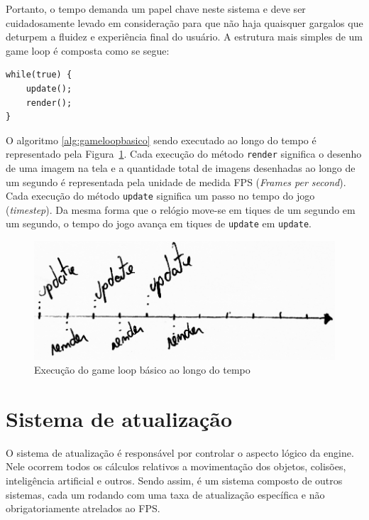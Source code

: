 \documentclass[12pt, 
openright, 
oneside, 
a4paper,    
brazil]{facom-ufu-abntex2}
\begin{document}
Portanto, o tempo demanda um papel chave neste sistema e deve ser cuidadosamente levado em consideração para que não haja quaisquer gargalos que deturpem a fluidez e experiência final do usuário. A estrutura mais simples de um game loop é composta como se segue:

\begin{lstlisting}[caption={Estrutura básica do Game Loop}, label={alg:gameloopbasico}]
while(true) {
	update();
	render();
}
\end{lstlisting}


O algoritmo \ref{alg:gameloopbasico} sendo executado ao longo do tempo é representado pela Figura~\ref{fig:gameloopbasico}.
Cada execução do método \texttt{render} significa o desenho de uma imagem na tela e a quantidade total de imagens desenhadas ao longo de um segundo é representada pela unidade de medida FPS (\textit{Frames per second}). Cada execução do método \texttt{update} significa um passo no tempo do jogo (\textit{timestep}). Da mesma forma que o relógio move-se em tiques de um segundo em um segundo, o tempo do jogo avança em tiques de \texttt{update} em \texttt{update}.

\begin{figure}[H]
	\centering
	\includegraphics[width=\textwidth]{imagens/ilu1_small.png}
	\caption{Execução do game loop básico ao longo do tempo\label{fig:gameloopbasico}}
\end{figure}




\section{Sistema de atualização}
O sistema de atualização é responsável por controlar o aspecto lógico da engine. Nele ocorrem todos os cálculos relativos a movimentação dos objetos, colisões, inteligência artificial e outros. Sendo assim, é um sistema composto de outros sistemas, cada um rodando com uma taxa de atualização específica e não obrigatoriamente atrelados ao FPS.
\end{document}
